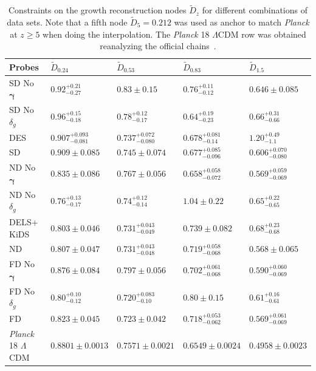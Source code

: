 \documentclass[a4paper,11pt]{article}
\newcommand{\shear}{\boldsymbol{\gamma}}
\newcommand{\lcdm}{$\Lambda$CDM\xspace}
\newcommand{\des}{DES\xspace}
\newcommand{\kids}{KiDS\xspace}
\newcommand{\planck}{{\sl Planck}\xspace}
\newcommand{\dls}{DELS\xspace}
\newcommand{\northd}{ND\xspace}
\newcommand{\southd}{SD\xspace}
\newcommand{\alld}{FD\xspace}
\begin{document}
        \begin{table}[tb]
            \centering
            \begin{tabular}{|lllll|}
                \hline
                Probes        & $\tilde{D}_{0.24}$ &  $\tilde{D}_{0.53}$ &  $\tilde{D}_{0.83}$ &  $\tilde{D}_{1.5}$\\
                \hline 
                \southd No $\shear$ & $ 0.92^{+0.21}_{-0.27}$ & $ 0.83\pm 0.15$ & $ 0.76^{+0.11}_{-0.12}$ & $ 0.646\pm 0.085$ \\
                \southd No $\delta_g$ & $ 0.96^{+0.15}_{-0.18}$ & $ 0.78^{+0.12}_{-0.17}$ & $ 0.64^{+0.19}_{-0.23}$ & $ 0.66^{+0.31}_{-0.66}$ \\
                \des & $ 0.907^{+0.093}_{-0.081}$ & $ 0.737^{+0.072}_{-0.080}$ & $ 0.678^{+0.081}_{-0.14}$ & $ 1.20^{+0.49}_{-1.1}$ \\
                \southd  & $ 0.909\pm 0.085$ & $ 0.745\pm 0.074$ & $ 0.677^{+0.085}_{-0.096}$ & $ 0.606^{+0.070}_{-0.080}$ \\
                \hline
                \northd No $\shear$ & $ 0.835\pm 0.086$ & $ 0.767\pm 0.056$ & $ 0.658^{+0.058}_{-0.072}$ & $ 0.569^{+0.059}_{-0.069}$ \\
                \northd No $\delta_g$ & $ 0.76^{+0.13}_{-0.17}$ & $ 0.74^{+0.12}_{-0.14}$ & $ 1.04\pm 0.22$ & $ 0.65^{+0.22}_{-0.65}$ \\
                \dls + \kids & $ 0.803\pm 0.046$ & $ 0.731^{+0.043}_{-0.049}$ & $ 0.739\pm 0.082$ & $ 0.68^{+0.23}_{-0.68}$ \\
                \northd & $ 0.807\pm 0.047$ & $ 0.731^{+0.043}_{-0.048}$ & $ 0.719^{+0.058}_{-0.068}$ & $ 0.568\pm 0.065$ \\
                \hline 
                \alld No $\shear$ & $0.876\pm 0.084$ & $ 0.797\pm 0.056$ & $ 0.702^{+0.061}_{-0.068}$ & $ 0.590^{+0.060}_{-0.069}$ \\
                \alld No $\delta_g$ & $ 0.80^{+0.10}_{-0.12}$ & $ 0.720^{+0.083}_{-0.10}$ & $ 0.80\pm 0.15$ & $ 0.61^{+0.16}_{-0.61}$ \\
                \alld & $0.823\pm 0.045$ & $ 0.723\pm 0.042$ & $ 0.718^{+0.053}_{-0.062}$ & $ 0.569^{+0.061}_{-0.069}$\\
                \hline
                \planck 18 \lcdm &$0.8801 \pm 0.0013$ & $0.7571 \pm 0.0021$ & $0.6549 \pm 0.0024$ & $0.4958 \pm 0.0023$\\
                \hline
            \end{tabular}
            \caption{Constraints on the growth reconstruction nodes $\tilde{D}_z$ for different combinations of data sets. Note that a fifth node $\tilde{D}_5 = 0.212$ was used as anchor to match \planck at $z\geq5$ when doing the interpolation. The \planck 18 \lcdm row was obtained reanalyzing the official chains~\cite{1807.06209}.}
            \label{tab:dpk}
        \end{table}
\end{document}
